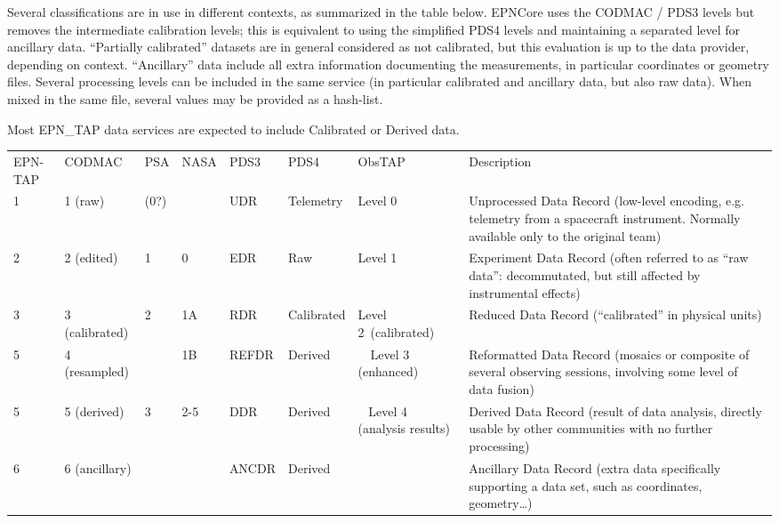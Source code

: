 \documentclass[11pt,a4paper]{ivoa}
\begin{document}
Several classifications are in use in different contexts, as summarized in the table below.  EPNCore uses the CODMAC / PDS3 levels but removes the intermediate calibration levels; this is equivalent to using the simplified PDS4 levels and maintaining a separated level for ancillary data. ``Partially calibrated'' datasets are in general considered as not calibrated, but this evaluation is up to the data provider, depending on context. ``Ancillary'' data include all extra information documenting the measurements, in particular coordinates or geometry files. Several processing levels can be included in the same service (in particular calibrated and ancillary data, but also raw data). When mixed in the same file, several values may be provided as a hash-list.

Most EPN\_TAP data services are expected to include Calibrated or Derived data. 



\begingroup\small\begin{inlinetable}
\begin{tabular}{lllllllp{}}
\sptablerule
EPN-TAP&CODMAC&PSA&NASA&PDS3&PDS4&ObsTAP&Description\\
\sptablerule

1 &1 (raw)&(0?)&&UDR&Telemetry&Level 0&Unprocessed Data Record (low-level encoding, e.g. telemetry from a spacecraft instrument. Normally available only to the original team)\\
2 &2 (edited)&1&0&EDR&Raw&Level 1&Experiment Data Record (often referred to as ``raw data'': decommutated, but still affected by instrumental effects)\\
3 &3 (calibrated)&2&1A&RDR&Calibrated&Level 2 (calibrated)&Reduced Data Record (``calibrated'' in physical units)\\
5&4 (resampled)&&1B&REFDR&Derived&~ Level 3 (enhanced)&Reformatted Data Record (mosaics or composite of several observing sessions, involving some level of data fusion)\\
5 &5 (derived)&3&2-5&DDR&Derived&~ Level 4 (analysis results)&Derived Data Record (result of data analysis, directly usable by other communities with no further processing)\\
6&6 (ancillary)&&&ANCDR&Derived&&Ancillary Data Record (extra data specifically supporting a data set, such as coordinates, geometry…) \\
\end{tabular}
\end{inlinetable}\endgroup
\end{document}
